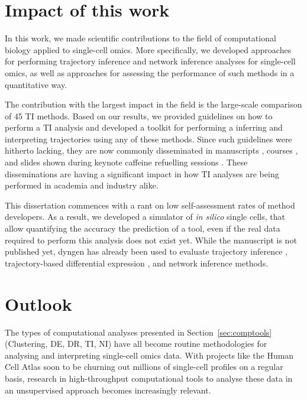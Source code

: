 

\section{Impact of this work}
In this work, we made scientific contributions to the field of computational biology applied to single-cell omics. More specifically, we developed approaches for performing trajectory inference and network inference analyses for single-cell omics, as well as approaches for assessing the performance of such methods in a quantitative way.

The contribution with the largest impact in the field is the large-scale comparison of 45 TI methods. Based on our results, we provided guidelines on how to perform a TI analysis and developed a toolkit for performing a inferring and interpreting trajectories using any of these methods. Since such guidelines were hitherto lacking, they are now commonly disseminated in manuscripts \cite{lafzi_tutorialguidelinesexperimental_2018, luecken_currentbestpractices_2019}, courses \cite{kiselev_analysissinglecell_2019, martens_analysissinglecell_2019}, and slides shown during keynote caffeine refuelling sessions \cite{hemberg_coffeebreakanalysis_2019}. These disseminations are having a significant impact in how TI analyses are being performed in academia and industry alike.

This dissertation commences with a rant on low self-assessment rates of method developers. As a result, we developed a simulator of \textit{in silico} single cells, that allow quantifying the accuracy the prediction of a tool, even if the real data required to perform this analysis does not exist yet. While the manuscript is not published yet, dyngen has already been used to evaluate trajectory inference \cite{saelens_comparisonsinglecelltrajectory_2019}, trajectory-based differential expression \cite{vandenberge_trajectorybaseddifferentialexpression_2019}, and network inference \cite{pratapa_benchmarkingalgorithmsgene_2019} methods. 



\section{Outlook}
The types of computational analyses presented in Section~\ref{sec:comptools} (Clustering, DE, DR, TI, NI) have all become routine methodologies for analysing and interpreting single-cell omics data. With projects like the Human Cell Atlas\cite{humancellatlasconsortium_humancellatlas_2018} soon to be churning out millions of single-cell profiles on a regular basis, research in high-throughput computational tools to analyse these data in an unsupervised approach becomes increasingly relevant. 

